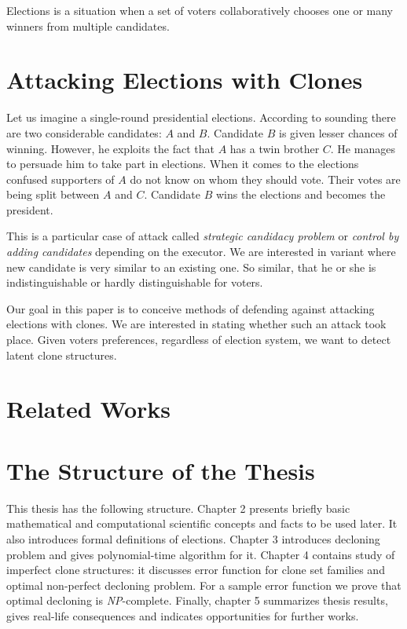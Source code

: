 Elections is a situation when a set of voters collaboratively chooses one or many winners from multiple candidates.

\section{Attacking Elections with Clones}

Let us imagine a single-round presidential elections.
According to sounding there are two considerable candidates: $A$ and $B$.
Candidate $B$ is given lesser chances of winning.
However, he exploits the fact that $A$ has a twin brother $C$.
He manages to persuade him to take part in elections.
When it comes to the elections confused supporters of $A$ do not know on whom they should vote.
Their votes are being split between $A$ and $C$.
Candidate $B$ wins the elections and becomes the president.

This is a particular case of attack called \textit{strategic candidacy problem} or \textit{control by adding candidates}
depending on the executor.
We are interested in variant where new candidate is very similar to an existing one.
So similar, that he or she is indistinguishable or hardly distinguishable for voters.

Our goal in this paper is to conceive methods of defending against attacking elections with clones.
We are interested in stating whether such an attack took place.
Given voters preferences, regardless of election system, we want to detect latent clone structures.

\section{Related Works}


\section{The Structure of the Thesis}


This thesis has the following structure.
Chapter 2 presents briefly basic mathematical and computational scientific concepts and facts to be used later.
It also introduces formal definitions of elections.
Chapter 3 introduces decloning problem and gives polynomial-time algorithm for it.
Chapter 4 contains study of imperfect clone structures:
it discusses error function for clone set families and optimal non-perfect decloning problem.
For a sample error function we prove that optimal decloning is \textit{NP}-complete.
Finally, chapter 5 summarizes thesis results, gives real-life consequences and indicates opportunities for further works.